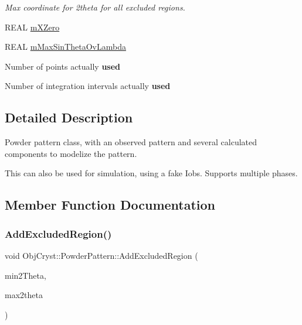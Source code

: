 \begin{DoxyCompactItemize}
\begin{DoxyCompactList}\small\item\em Max coordinate for 2theta for all excluded regions. \end{DoxyCompactList}\item 
R\+E\+AL \mbox{\hyperlink{class_obj_cryst_1_1_powder_pattern_ae4722ceea4440d27a7de6115f70705ab}{m\+X\+Zero}}
\item 
R\+E\+AL \mbox{\hyperlink{class_obj_cryst_1_1_powder_pattern_a5af69d404bd80c279935990a24edec0b}{m\+Max\+Sin\+Theta\+Ov\+Lambda}}
\item 
\mbox{\label{class_obj_cryst_1_1_powder_pattern_ad709ac89cea3bf5eb5d29f7beb429794}} 
Number of points actually {\bfseries used}
\item 
\mbox{\label{class_obj_cryst_1_1_powder_pattern_ae6d9f72cbed814c222921f274db95280}} 
Number of integration intervals actually {\bfseries used}
\end{DoxyCompactItemize}


\subsection{Detailed Description}
Powder pattern class, with an observed pattern and several calculated components to modelize the pattern. 

This can also be used for simulation, using a fake Iobs. Supports multiple phases. 

\subsection{Member Function Documentation}
\mbox{\label{class_obj_cryst_1_1_powder_pattern_a964850cf74baa499f823e85447959790}} 
\subsubsection{\texorpdfstring{AddExcludedRegion()}{AddExcludedRegion()}}
{\footnotesize\ttfamily void Obj\+Cryst\+::\+Powder\+Pattern\+::\+Add\+Excluded\+Region (\begin{DoxyParamCaption}\item[{const R\+E\+AL}]{min2\+Theta,  }\item[{const R\+E\+AL}]{max2theta }\end{DoxyParamCaption})}

